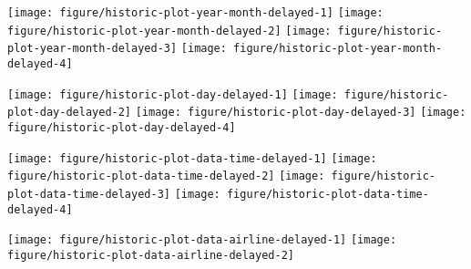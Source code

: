 \documentclass{article}\usepackage[]{graphicx}\usepackage[]{color}
\newenvironment{knitrout}{}{} %
\begin{document}
\begin{knitrout}
\color{fgcolor}

{\centering \texttt{[image: figure/historic-plot-year-month-delayed-1]} 
\texttt{[image: figure/historic-plot-year-month-delayed-2]} 
\texttt{[image: figure/historic-plot-year-month-delayed-3]} 
\texttt{[image: figure/historic-plot-year-month-delayed-4]} 

}



\end{knitrout}

\begin{knitrout}
\color{fgcolor}

{\centering \texttt{[image: figure/historic-plot-day-delayed-1]} 
\texttt{[image: figure/historic-plot-day-delayed-2]} 
\texttt{[image: figure/historic-plot-day-delayed-3]} 
\texttt{[image: figure/historic-plot-day-delayed-4]} 

}



\end{knitrout}


\begin{knitrout}
\color{fgcolor}

{\centering \texttt{[image: figure/historic-plot-data-time-delayed-1]} 
\texttt{[image: figure/historic-plot-data-time-delayed-2]} 
\texttt{[image: figure/historic-plot-data-time-delayed-3]} 
\texttt{[image: figure/historic-plot-data-time-delayed-4]} 

}



\end{knitrout}

\begin{knitrout}
\color{fgcolor}

{\centering \texttt{[image: figure/historic-plot-data-airline-delayed-1]} 
\texttt{[image: figure/historic-plot-data-airline-delayed-2]} 

}



\end{knitrout}
\end{document}
